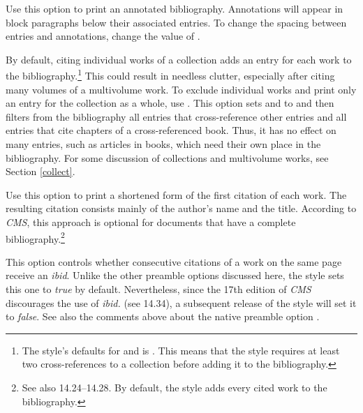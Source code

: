 \documentclass[11pt,letterpaper,oneside]{article}
\begin{document}
\begin{optionlist}


Use this option to print an annotated bibliography. Annotations will
appear in block paragraphs below their associated entries. To change
the spacing between entries and annotations, change the value of
.


By default, citing individual works of a collection adds an entry for
each work to the bibliography.\footnote{The style's defaults for
 and  is . This means
that the style requires at least two cross-references to a collection
before adding it to the bibliography.} This could result in needless
clutter, especially after citing many volumes of a multivolume work.
To exclude individual works and print only an entry for the collection
as a whole, use . This option sets 
and  to  and then filters from the
bibliography all  entries that cross-reference other
entries and all  entries that cite chapters of a
cross-referenced book. Thus, it has no effect on many
 entries, such as articles in books, which need
their own place in the bibliography. For some discussion of
collections and multivolume works, see Section \ref{collect}.


Use this option to print a shortened form of the first citation of
each work. The resulting citation consists mainly of the author's name
and the title. According to \textit{CMS}, this approach is optional
for documents that have a complete
bibliography.\footnote{\cite[14.14]{chicago2010} See also
14.24--14.28. By default, the style adds every cited work to the
bibliography.}


This option controls whether consecutive citations of a work on the
same page receive an \textit{ibid}. Unlike the other preamble options
discussed here, the style sets this one to \textit{true} by default.
Nevertheless, since the 17th edition of \textit{CMS} discourages the
use of \textit{ibid.} (see 14.34), a subsequent release of the style
will set it to \textit{false}. See also the comments above about the
native preamble option .


\end{optionlist}
\end{document}
